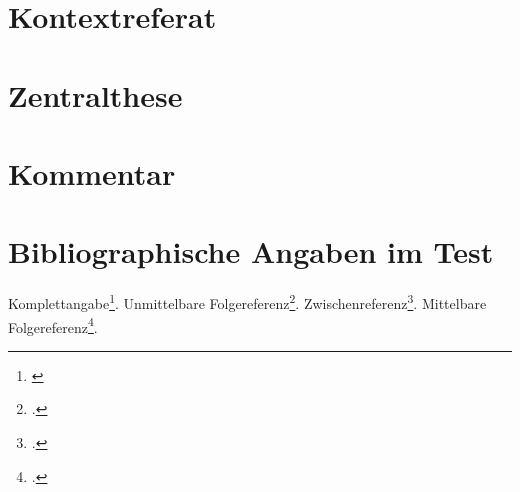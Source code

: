 %
%
%



\section{Kontextreferat}
\section{Zentralthese}
\section{Kommentar}

\section{Bibliographische Angaben im Test}

Komplettangabe\footnote{\cite[cf.][S.1]{Covey2006a}}.
Unmittelbare Folgereferenz\footcite[cf.][S.2]{Covey2006a}.
Zwischenreferenz\footcite[cf.][S.3]{KantKdU1974}.
Mittelbare Folgereferenz\footcite[cf.][S.4]{Covey2006a}.



